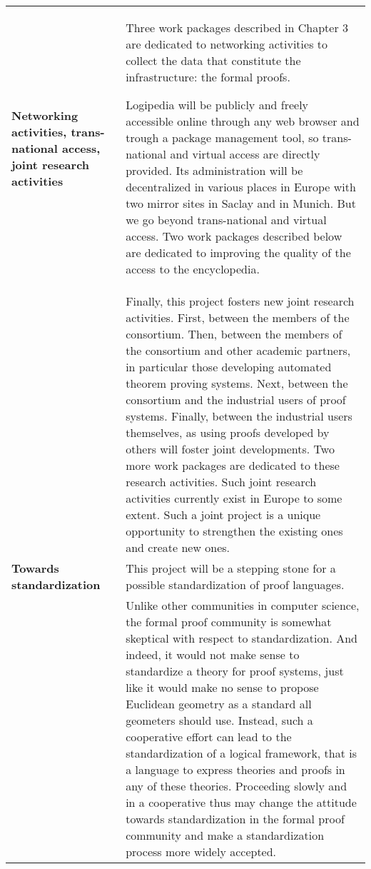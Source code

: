 \begin{longtable}{|p{}|p{}|}
{\bf Networking activities, trans-national access, joint research activities}
&
Three work packages described in Chapter 3
are dedicated to networking activities
to collect the data that constitute the infrastructure: the formal proofs.

\hspace{0.4cm}
Logipedia will be publicly and freely accessible online through any
web browser and trough a package management tool, so trans-national
and virtual access are directly provided. Its administration will be
decentralized in various places in Europe with two mirror sites in
Saclay and in Munich. But we go beyond trans-national and virtual
access.  Two work packages described below are dedicated to improving
the quality of the access to the encyclopedia.\\
&
\hspace{0.4cm}
Finally, this project fosters new joint research activities. First,
between the members of the consortium. Then, between the members of
the consortium and other academic partners, in particular those
developing automated theorem proving systems. Next, between the
consortium and the industrial users of proof systems. Finally, between
the industrial users themselves, as using proofs developed by others
will foster joint developments. Two more work packages are dedicated
to these research activities.  Such joint research activities
currently exist in Europe to some extent.  Such a joint project is a
unique opportunity to strengthen the existing ones and create new
ones.
\\
\hline

{\bf Towards standardization}
&
This project will be a stepping stone for a possible standardization
of proof languages.
\\
&
\hspace{0.4cm}
Unlike other communities in computer science, the formal proof
community is somewhat skeptical with respect to standardization. And
indeed, it would not make sense to standardize a theory for proof
systems, just like it would make no sense to propose Euclidean
geometry as a standard all geometers should use.  Instead, such a
cooperative effort can lead to the standardization of a logical
framework, that is a language to express theories and proofs in any of
these theories. Proceeding slowly and in a cooperative thus may change
the attitude towards standardization in the formal proof community and
make a standardization process more widely accepted.
\\
\hline


\end{longtable}
